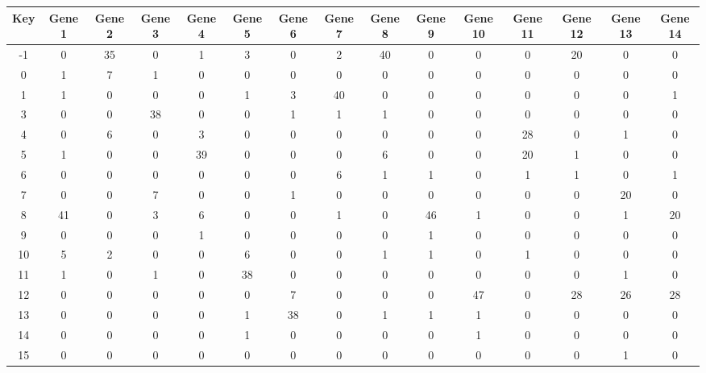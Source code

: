 \begin{tabular}{|c|c|c|c|c|c|c|c|c|c|c|c|c|c|c|}
\hline
Key & Gene 1 & Gene 2 & Gene 3 & Gene 4 & Gene 5 & Gene 6 & Gene 7 & Gene 8 & Gene 9 & Gene 10 & Gene 11 & Gene 12 & Gene 13 & Gene 14 \\
\hline
-1 & 0 & 35 & 0 & 1 & 3 & 0 & 2 & 40 & 0 & 0 & 0 & 20 & 0 & 0 \\
0 & 1 & 7 & 1 & 0 & 0 & 0 & 0 & 0 & 0 & 0 & 0 & 0 & 0 & 0 \\
1 & 1 & 0 & 0 & 0 & 1 & 3 & 40 & 0 & 0 & 0 & 0 & 0 & 0 & 1 \\
3 & 0 & 0 & 38 & 0 & 0 & 1 & 1 & 1 & 0 & 0 & 0 & 0 & 0 & 0 \\
4 & 0 & 6 & 0 & 3 & 0 & 0 & 0 & 0 & 0 & 0 & 28 & 0 & 1 & 0 \\
5 & 1 & 0 & 0 & 39 & 0 & 0 & 0 & 6 & 0 & 0 & 20 & 1 & 0 & 0 \\
6 & 0 & 0 & 0 & 0 & 0 & 0 & 6 & 1 & 1 & 0 & 1 & 1 & 0 & 1 \\
7 & 0 & 0 & 7 & 0 & 0 & 1 & 0 & 0 & 0 & 0 & 0 & 0 & 20 & 0 \\
8 & 41 & 0 & 3 & 6 & 0 & 0 & 1 & 0 & 46 & 1 & 0 & 0 & 1 & 20 \\
9 & 0 & 0 & 0 & 1 & 0 & 0 & 0 & 0 & 1 & 0 & 0 & 0 & 0 & 0 \\
10 & 5 & 2 & 0 & 0 & 6 & 0 & 0 & 1 & 1 & 0 & 1 & 0 & 0 & 0 \\
11 & 1 & 0 & 1 & 0 & 38 & 0 & 0 & 0 & 0 & 0 & 0 & 0 & 1 & 0 \\
12 & 0 & 0 & 0 & 0 & 0 & 7 & 0 & 0 & 0 & 47 & 0 & 28 & 26 & 28 \\
13 & 0 & 0 & 0 & 0 & 1 & 38 & 0 & 1 & 1 & 1 & 0 & 0 & 0 & 0 \\
14 & 0 & 0 & 0 & 0 & 1 & 0 & 0 & 0 & 0 & 1 & 0 & 0 & 0 & 0 \\
15 & 0 & 0 & 0 & 0 & 0 & 0 & 0 & 0 & 0 & 0 & 0 & 0 & 1 & 0 \\
\hline
\end{tabular}